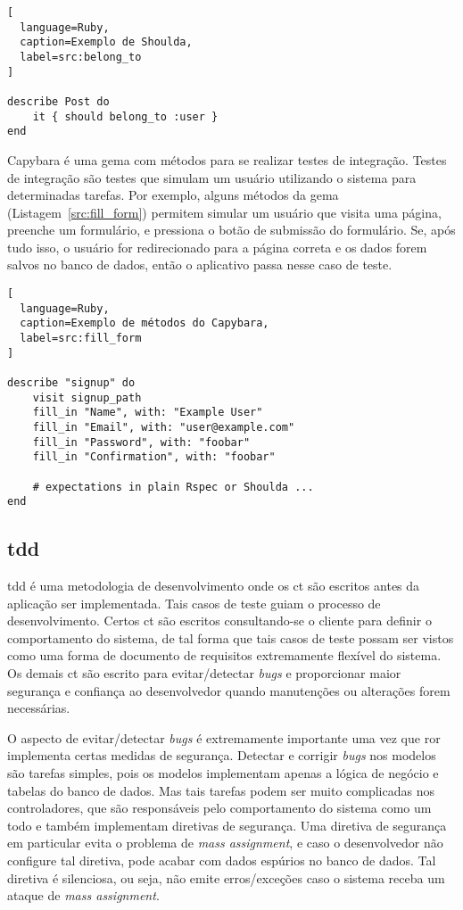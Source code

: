 \begin{lstlisting}[
  language=Ruby,
  caption=Exemplo de Shoulda,
  label=src:belong_to
]

describe Post do
	it { should belong_to :user }
end

\end{lstlisting}

Capybara é uma gema com métodos para se realizar testes de integração. Testes de integração são testes que simulam um usuário utilizando o sistema para
determinadas tarefas. Por exemplo, alguns métodos da gema (Listagem~\ref{src:fill_form}) permitem simular um usuário que visita uma página,
preenche um formulário, e pressiona o botão de submissão do formulário. Se, após tudo isso, o usuário for redirecionado para a página correta e os dados
forem salvos no banco de dados, então o aplicativo passa nesse caso de teste.

\begin{lstlisting}[
  language=Ruby,
  caption=Exemplo de métodos do Capybara,
  label=src:fill_form
]

describe "signup" do
	visit signup_path
	fill_in "Name", with: "Example User"
	fill_in "Email", with: "user@example.com"
	fill_in "Password", with: "foobar"
	fill_in "Confirmation", with: "foobar"
	
	# expectations in plain Rspec or Shoulda ...
end

\end{lstlisting}

\subsection{\gls{tdd}}

\gls{tdd} é uma metodologia de desenvolvimento onde os \gls{ct} são escritos antes da aplicação ser implementada. Tais casos de teste guiam
o processo de desenvolvimento. Certos \gls{ct} são escritos consultando-se o cliente para definir o comportamento do sistema, de tal forma que 
tais casos de teste possam ser vistos como uma forma de documento de requisitos extremamente flexível do sistema. Os demais \gls{ct}
são escrito para evitar/detectar \textit{bugs} e proporcionar maior segurança e confiança ao desenvolvedor quando manutenções ou alterações forem necessárias.

O aspecto de evitar/detectar \textit{bugs} é extremamente importante uma vez que \gls{ror} implementa certas medidas de segurança. Detectar e 
corrigir \textit{bugs} nos modelos são tarefas simples, pois os modelos implementam apenas a lógica de negócio e tabelas do banco de dados. Mas tais tarefas
podem ser muito complicadas nos controladores, que são responsáveis pelo comportamento do sistema como um todo e também implementam diretivas de segurança.
Uma diretiva de segurança em particular evita o problema de \textit{mass assignment}, e caso o desenvolvedor não configure tal diretiva, pode acabar com
dados espúrios no banco de dados. Tal diretiva é silenciosa, ou seja, não emite erros/exceções caso o sistema receba um ataque de \textit{mass assignment}.

